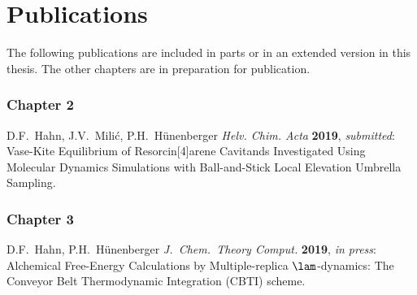 \chapter{Publications}

The following publications are included in parts or in an extended version in this
thesis. The other chapters are in preparation for publication.

\subsection*{Chapter 2}

D.F.\ Hahn, J.V.\ Mili\'{c}, P.H.\ H\"{u}nenberger {\em Helv. Chim. Acta} {\bf 2019}, {\em submitted}:
Vase-Kite Equilibrium of Resorcin[4]arene Cavitands Investigated Using Molecular Dynamics Simulations with Ball-and-Stick Local Elevation Umbrella Sampling.

\subsection*{Chapter 3}

D.F.\ Hahn, P.H.\ H\"{u}nenberger {\em J.\ Chem.\ Theory Comput.} {\bf 2019}, {\em in press}:
Alchemical Free-Energy Calculations by Multiple-replica $\lam$-dynamics: The Conveyor Belt Thermodynamic Integration (CBTI) scheme.


